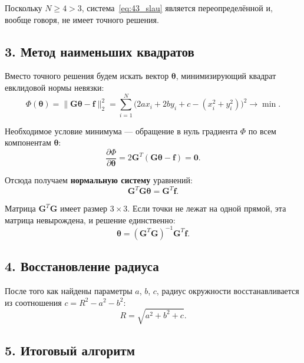 \documentclass{article}
\begin{document}
Поскольку $N \geqslant 4 > 3$, система~\eqref{eq:43_slau} является переопределённой и, вообще говоря, не имеет точного решения.

\subsection*{3. Метод наименьших квадратов}

Вместо точного решения будем искать вектор $\boldsymbol{\theta}$, минимизирующий квадрат евклидовой нормы невязки:
\begin{equation}
\Phi(\boldsymbol{\theta}) = \|\mathbf{G}\boldsymbol{\theta} - \mathbf{f}\|_2^2 = \sum_{i=1}^{N} \bigl(2a x_i + 2b y_i + c - (x_i^2 + y_i^2)\bigr)^2 \to \min.
\end{equation}

Необходимое условие минимума --- обращение в нуль градиента $\Phi$ по всем компонентам $\boldsymbol{\theta}$:
\begin{equation}
\frac{\partial \Phi}{\partial \boldsymbol{\theta}} = 2\mathbf{G}^T(\mathbf{G}\boldsymbol{\theta} - \mathbf{f}) = \mathbf{0}.
\end{equation}

Отсюда получаем \textbf{нормальную систему} уравнений:
\begin{equation}
\mathbf{G}^T \mathbf{G} \boldsymbol{\theta} = \mathbf{G}^T \mathbf{f}.
\label{eq:43_normal}
\end{equation}

Матрица $\mathbf{G}^T \mathbf{G}$ имеет размер $3 \times 3$. Если точки не лежат на одной прямой, эта матрица невырождена, и решение единственно:
\begin{equation}
\boldsymbol{\theta} = (\mathbf{G}^T \mathbf{G})^{-1} \mathbf{G}^T \mathbf{f}.
\label{eq:43_sol}
\end{equation}

\subsection*{4. Восстановление радиуса}

После того как найдены параметры $a$, $b$, $c$, радиус окружности восстанавливается из соотношения $c = R^2 - a^2 - b^2$:
\begin{equation}
R = \sqrt{a^2 + b^2 + c}.
\end{equation}

\subsection*{5. Итоговый алгоритм}
\end{document}
